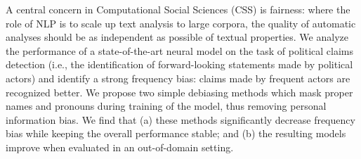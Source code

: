 A central concern in Computational Social Sciences (CSS) is fairness: where the role of NLP is to scale up text analysis to large corpora, the quality of automatic analyses should be as independent as possible of textual properties. We analyze the performance of a state-of-the-art neural model on the task of political claims detection  (i.e., the identification of forward-looking statements made by political actors) and identify a strong frequency bias:  claims made by frequent actors are recognized better. We propose two simple debiasing methods which mask proper names and pronouns during training of the model, thus removing personal information bias.  We find that (a) these methods significantly decrease frequency bias while keeping the overall performance stable; and  (b) the resulting models improve when evaluated in an out-of-domain setting.

